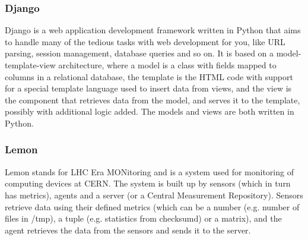 \subsubsection{Django}
Django is a web application development framework written in Python that aims to handle many of the tedious tasks with web development for you, like URL parsing, session management, database queries and so on.\cite{django} It is based on a model-template-view architecture, where a model is a class with fields mapped to columns in a relational database, the template is the HTML code with support for a special template language used to insert data from views, and the view is the component that retrieves data from the model, and serves it to the template, possibly with additional logic added. The models and views are both written in Python.

\subsubsection{Lemon}
Lemon stands for LHC Era MONitoring and is a system used for monitoring of computing devices at CERN. The system is built up by sensors (which in turn has metrics), agents and a server (or a Central Measurement Repository). Sensors retrieve data using their defined metrics (which can be a number (e.g. number of files in /tmp), a tuple (e.g. statistics from checksumd) or a matrix), and the agent retrieves the data from the sensors and sends it to the server. 

